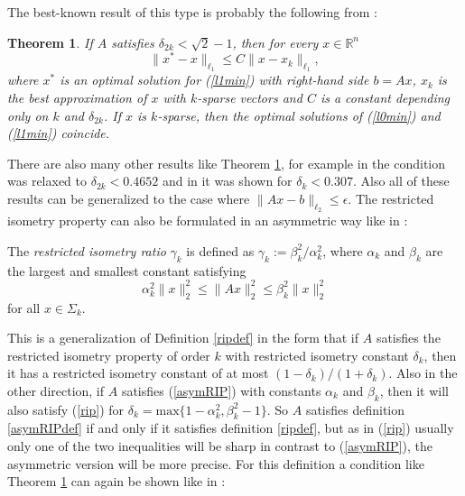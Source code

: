 \documentclass[a4paper,11pt,1p]{elsarticle}
\newtheorem{thm}{Theorem}
\newcommand{\R}{\mathds{R}}
\begin{document}
 The best-known result of this type is probably the following from \cite{Can08}:
 
\begin{thm} \label{RIPsqrt2}
 If $A$ satisfies $\delta_{2k} < \sqrt{2}-1$, then for every $x \in \R^n$
 \begin{equation*}
  \|x^* - x \|_{\ell_1} \leq C \|x - x_k \|_{\ell_1},
 \end{equation*}
where $x^*$ is an optimal solution for (\ref{l1min}) with right-hand side $b = Ax$, $x_k$ is the best approximation of $x$ with $k$-sparse vectors and $C$ is a constant depending only on $k$ and $\delta_{2k}$. If $x$ is $k$-sparse, 
then the optimal solutions of (\ref{l0min}) and (\ref{l1min}) coincide.\end{thm}

There are also many other results like Theorem \ref{RIPsqrt2}, for example in \cite{fou10} the condition was relaxed to $\delta_{2k} < 0.4652$ and in \cite{CWX10} it was shown for $\delta_k < 0.307$. Also all of these results can be
generalized to the case where $\|Ax - b\|_{\ell_2} \leq \epsilon$. The restricted isometry property can also be formulated in an asymmetric way like in \cite{FL09}:

\begin{rmk} \label{asymRIPdef}
The \emph{restricted isometry ratio} $\gamma_k$ is defined as $\gamma_k := \beta_k^2 / \alpha_k^2$, where $\alpha_k$ and $\beta_k$ are the largest and smallest constant satisfying
\begin{equation}\label{asymRIP}
   \alpha_k^2\|x\|_2^2 \leq \|Ax\|_2^2 \leq \beta_k^2\|x\|_2^2
\end{equation}
for all $x \in \Sigma_k$.
\end{rmk}

This is a generalization of Definition \ref{ripdef} in the form that if $A$ satisfies the restricted isometry property of order $k$ with restricted isometry constant $\delta_k$, then it has a restricted isometry constant of at most 
$(1 - \delta_k) / (1 + \delta_k)$. Also in the other direction, if $A$ satisfies (\ref{asymRIP}) with constants $\alpha_k$ and $\beta_k$, then it will also satisfy (\ref{rip}) for 
$\delta_k = \text{max} \{ 1 - \alpha_k^2, \beta_k^2 - 1 \}$. So $A$ satisfies definition \ref{asymRIPdef} if and only if it satisfies definition \ref{ripdef}, but as in (\ref{rip}) usually only one of the two inequalities will 
be sharp in contrast to (\ref{asymRIP}), the asymmetric version will be more precise. For this definition a condition like Theorem \ref{RIPsqrt2} can again be shown like in \cite{FL09}:
\end{document}
